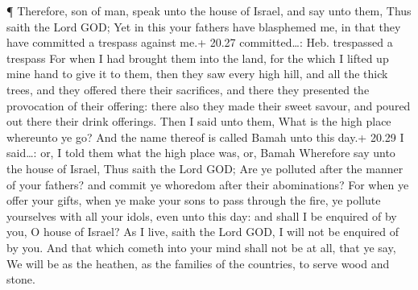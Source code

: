  ¶ Therefore, son of man, speak unto the house of Israel,
and say unto them, Thus saith the Lord GOD; Yet in this your fathers
have blasphemed me, in that they have committed a trespass against me.+
20.27 committed\ldots: Heb. trespassed a trespass  For when
I had brought them into the land, for the which I lifted up mine hand to
give it to them, then they saw every high hill, and all the thick trees,
and they offered there their sacrifices, and there they presented the
provocation of their offering: there also they made their sweet savour,
and poured out there their drink offerings.  Then I said
unto them, What is the high place whereunto ye go? And the name thereof
is called Bamah unto this day.+ 20.29 I said\ldots: or, I told them what
the high place was, or, Bamah  Wherefore say unto the house
of Israel, Thus saith the Lord GOD; Are ye polluted after the manner of
your fathers? and commit ye whoredom after their abominations?
 For when ye offer your gifts, when ye make your sons to
pass through the fire, ye pollute yourselves with all your idols, even
unto this day: and shall I be enquired of by you, O house of Israel? As
I live, saith the Lord GOD, I will not be enquired of by you.
 And that which cometh into your mind shall not be at all,
that ye say, We will be as the heathen, as the families of the
countries, to serve wood and stone.

